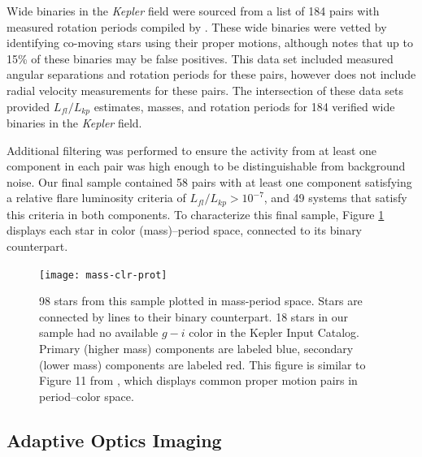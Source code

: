 \documentclass[preprint2]{aastex61}
\newcommand{\Kepler}{\textsl{Kepler}\xspace}
\begin{document}
Wide binaries in the \Kepler field were sourced from a list of 184 pairs with measured rotation periods compiled by \citet{janes2017}. These wide binaries were vetted by identifying co-moving stars using their proper motions, although \citet{janes2017} notes that up to 15\% of these binaries may be false positives. This data set included measured angular separations and rotation periods for these pairs, however does not include radial velocity measurements for these pairs. The intersection of these data sets provided $L_{fl}/L_{kp}$ estimates, masses, and rotation periods for 184 verified wide binaries in the \Kepler field.

Additional filtering was performed to ensure the activity from at least one component in each pair was high enough to be distinguishable from background noise. Our final sample contained 58 pairs with at least one component satisfying a relative flare luminosity criteria of $L_{fl}/L_{kp} > 10^{-7}$, and 49 systems that satisfy this criteria in both components. To characterize this final sample, Figure \ref{fig:mass-prot} displays each star in color (mass)--period space, connected to its binary counterpart.

\begin{figure}[!ht]
\centering
\texttt{[image: mass-clr-prot]}
\caption{98 stars from this sample plotted in mass-period space. Stars are connected by lines to their binary counterpart. 18 stars in our sample had no available $g-i$ color in the Kepler Input Catalog. Primary (higher mass) components are labeled blue, secondary (lower mass) components are labeled red. This figure is similar to Figure 11 from \citet{janes2017}, which displays common proper motion pairs in period--color space.  
}
\label{fig:mass-prot}
\end{figure}


\subsection{Adaptive Optics Imaging}
\label{sec:AO}
\end{document}
